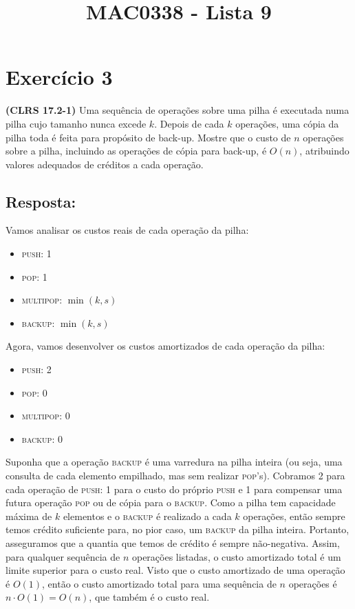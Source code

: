 \documentclass{article}
\title{MAC0338 - Lista 9}
\author{}
\date{}
\begin{document}
\maketitle

\section*{Exercício 3}
\textbf{(CLRS 17.2-1)} Uma sequência de operações sobre uma pilha é executada numa pilha cujo tamanho nunca excede $k$. Depois de cada $k$ operações, uma cópia da pilha toda é feita para propósito de back-up. Mostre que o custo de $n$ operações sobre a pilha, incluindo as operações de cópia para back-up, é $O(n)$, atribuindo valores adequados de créditos a cada operação.

\bigskip

\subsection*{Resposta:}
Vamos analisar os custos reais de cada operação da pilha:
\begin{multicols}{4}
\begin{itemize}
  \item \textsc{push}: 1
  \item \textsc{pop}: 1
  \item \textsc{multipop}: $\min(k,s)$
  \item \textsc{backup}: $\min(k,s)$
\end{itemize}
\end{multicols}

Agora, vamos desenvolver os custos amortizados de cada operação da pilha:
\begin{multicols}{4}
\begin{itemize}
  \item \textsc{push}: 2
  \item \textsc{pop}: 0
  \item \textsc{multipop}: 0
  \item \textsc{backup}: 0
\end{itemize}
\end{multicols}
Suponha que a operação \textsc{backup} é uma varredura na pilha inteira (ou seja, uma consulta de cada elemento empilhado, mas sem realizar \textsc{pop}'s).
Cobramos 2 para cada operação de \textsc{push}: 1 para o custo do próprio \textsc{push} e 1 para compensar uma futura operação \textsc{pop} ou de cópia para o \textsc{backup}.
Como a pilha tem capacidade máxima de $k$ elementos e o \textsc{backup} é realizado a cada $k$ operações, então sempre temos crédito suficiente para, no pior caso, um \textsc{backup} da pilha inteira.
Portanto, asseguramos que a quantia que temos de crédito é sempre não-negativa.
Assim, para qualquer sequência de $n$ operações listadas, o custo amortizado total é um limite superior para o custo real.
Visto que o custo amortizado de uma operação é $O(1)$, então o custo amortizado total para uma sequência de $n$ operações é $n \cdot O(1) = O(n)$, que também é o custo real.
\end{document}
